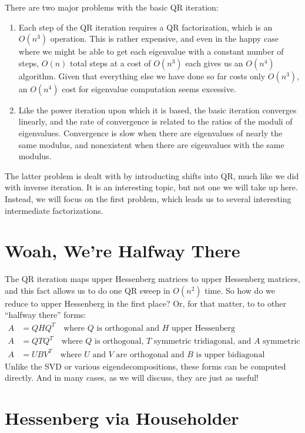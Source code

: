 \documentclass[12pt, leqno]{article} %
\begin{document}
There are two major problems with the basic QR iteration:
\begin{enumerate}
\item
  Each step of the QR iteration requires a QR factorization, which is
  an $O(n^3)$ operation.  This is rather expensive, and even in the happy
  case where we might be able to get each eigenvalue with a constant
  number of steps, $O(n)$ total steps at a cost of $O(n^3)$ each gives
  us an $O(n^4)$ algorithm.  Given that everything else we have done
  so far costs only $O(n^3)$, an $O(n^4)$ cost for eigenvalue computation
  seems excessive.
\item
  Like the power iteration upon which it is based, the basic iteration
  converges linearly, and the rate of convergence is related to the
  ratios of the moduli of eigenvalues.  Convergence is slow when there
  are eigenvalues of nearly the same modulus, and nonexistent when
  there are eigenvalues with the same modulus.
\end{enumerate}
The latter problem is dealt with by introducting shifts into QR,
much like we did with inverse iteration.  It is an interesting topic,
but not one we will take up here.  Instead, we will focus on the first
problem, which leads us to several interesting intermediate factorizations.

\section{Woah, We're Halfway There}

The QR iteration maps upper Hessenberg
matrices to upper Hessenberg matrices, and this fact allows us to do
one QR sweep in $O(n^2)$ time.  So how do we reduce to upper
Hessenberg in the first place?  Or, for that matter, to
to other ``halfway there'' forms:
\begin{align*}
  A &= Q H Q^T \quad \mbox{where $Q$ is orthogonal and $H$ upper
    Hessenberg} \\
  A &= Q T Q^T \quad \mbox{where $Q$ is orthogonal, $T$ symmetric
    tridiagonal, and $A$ symmetric} \\
  A &= U B V^T \quad \mbox{where $U$ and $V$ are orthogonal and $B$ is
    upper bidiagonal}
\end{align*}
Unlike the SVD or various eigendecompositions, these forms can be
computed directly.  And in many cases, as we will discuss, they are
just as useful!

\section{Hessenberg via Householder}
\end{document}
